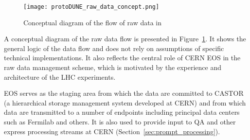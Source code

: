 \begin{figure}[tbh]
\centering\texttt{[image: protoDUNE\_raw\_data\_concept.png]}
\caption{\label{fig:raw_concept}Conceptual diagram of the flow of raw data in \pdsp}
\end{figure}


A conceptual diagram of the raw data flow is presented in Figure~\ref{fig:raw_concept}. It shows the general logic
of the data flow and does not rely on assumptions of specific technical implementations. 
It also reflects the central role of CERN EOS in the raw data management scheme, which is motivated by the experience
and architecture of the LHC experiments.

EOS serves as the staging area from which the data are committed to CASTOR (a hierarchical storage management system developed at CERN)
and from which data are transmitted to a number of endpoints including principal data centers such as Fermilab and others.
It is also used to provide input to QA and other express processing streams at CERN (Section~\ref{sec:prompt_processing}).


